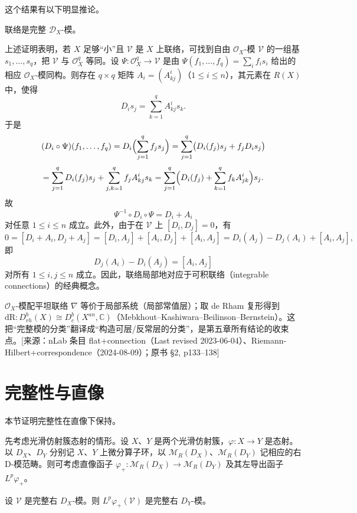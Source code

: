 这个结果有以下明显推论。

\begin{corollary}\label{cor:5.2.2}
联络是完整 $\mathcal{D}_X$-模。
\end{corollary}

上述证明表明，若 $X$ 足够“小”且 $\mathcal{V}$ 是 $X$ 上联络，可找到自由 $\mathcal{O}_X$-模 $\mathcal{V}$ 的一组基 $s_1,\dots,s_q$，把 $\mathcal{V}$ 与 $\mathcal{O}_X^q$ 等同。设 $\Psi:\mathcal{O}_X^q\to\mathcal{V}$ 是由
$\Psi(f_1,\dots,f_q)=\sum_i f_is_i$ 给出的相应 $\mathcal{O}_X$-模同构。则存在 $q\times q$ 矩阵 $A_i=(A^i_{kj})$（$1\le i\le n$），其元素在 $R(X)$ 中，使得
$$D_is_j=\sum_{k=1}^qA^i_{kj}s_k.$$
于是
$$(D_i\circ\Psi)(f_1,\dots,f_q)=D_i\Bigl(\sum_{j=1}^qf_js_j\Bigr)=\sum_{j=1}^q\bigl(D_i(f_j)s_j+f_jD_is_j\bigr)$$
$$=\sum_{j=1}^qD_i(f_j)s_j+\sum_{j,k=1}^qf_jA^i_{kj}s_k
=\sum_{j=1}^q\Bigl(D_i(f_j)+\sum_{k=1}^qf_kA^i_{jk}\Bigr)s_j.$$
故
$$\Psi^{-1}\circ D_i\circ\Psi=D_i+A_i$$
对任意 $1\le i\le n$ 成立。此外，由于在 $\mathcal{V}$ 上 $[D_i,D_j]=0$，有
$$0=[D_i+A_i,D_j+A_j]=[D_i,A_j]+[A_i,D_j]+[A_i,A_j]=D_i(A_j)-D_j(A_i)+[A_i,A_j],$$
即
$$D_j(A_i)-D_i(A_j)=[A_i,A_j]$$
对所有 $1\le i,j\le n$ 成立。因此，联络局部地对应于可积联络（integrable connections）的经典概念。
\begin{annote}
$\mathcal O_X$-模配平坦联络 $\nabla$ 等价于局部系统（局部常值层）；取 de Rham 复形得到 $\mathrm{dR}:D^b_{rh}(X)\cong D^b_c(X^{an},\mathbb C)$（Mebkhout–Kashiwara–Beilinson–Bernstein）。这把“完整模的分类”翻译成“构造可层/反常层的分类”，是第五章所有结论的收束点。[来源：nLab 条目 flat+connection（Last revised 2023-06-04）、Riemann-Hilbert+correspondence（2024-08-09）；原书 §2, p133–138]
\end{annote}



\section{完整性与直像}

本节证明完整性在直像下保持。

先考虑光滑仿射簇态射的情形。设 $X$、$Y$ 是两个光滑仿射簇，$\varphi:X\to Y$ 是态射。以 $D_X$、$D_Y$ 分别记 $X$、$Y$ 上微分算子环，以 $\mathcal{M}_R(D_X)$、$\mathcal{M}_R(D_Y)$ 记相应的右 D-模范畴。则可考虑直像函子
$\varphi_+:\mathcal{M}_R(D_X)\to\mathcal{M}_R(D_Y)$ 及其左导出函子 $L^p\varphi_+$。

\begin{theorem}\label{thm:5.3.1}
设 $\mathcal{V}$ 是完整右 $D_X$-模。则 $L^p\varphi_+(\mathcal{V})$ 是完整右 $D_Y$-模。
\end{theorem}

